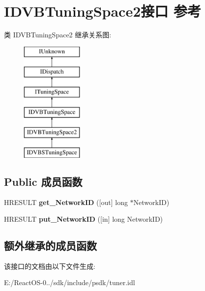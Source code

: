 \hypertarget{interface_i_d_v_b_tuning_space2}{}\section{I\+D\+V\+B\+Tuning\+Space2接口 参考}
\label{interface_i_d_v_b_tuning_space2}
类 I\+D\+V\+B\+Tuning\+Space2 继承关系图\+:\begin{figure}[H]
\begin{center}
\leavevmode
\includegraphics[height=6.000000cm]{interface_i_d_v_b_tuning_space2}
\end{center}
\end{figure}
\subsection*{Public 成员函数}
\begin{DoxyCompactItemize}
\item 
\mbox{\label{interface_i_d_v_b_tuning_space2_a452b64a7dbae79ff7cad2206127e99bc}} 
H\+R\+E\+S\+U\+LT {\bfseries get\+\_\+\+Network\+ID} (\mbox{[}out\mbox{]} long $\ast$Network\+ID)
\item 
\mbox{\label{interface_i_d_v_b_tuning_space2_a205386518413458c4d2c97e153ebb4a4}} 
H\+R\+E\+S\+U\+LT {\bfseries put\+\_\+\+Network\+ID} (\mbox{[}in\mbox{]} long Network\+ID)
\end{DoxyCompactItemize}
\subsection*{额外继承的成员函数}


该接口的文档由以下文件生成\+:\begin{DoxyCompactItemize}
\item 
E\+:/\+React\+O\+S-\/0../sdk/include/psdk/tuner.\+idl\end{DoxyCompactItemize}
